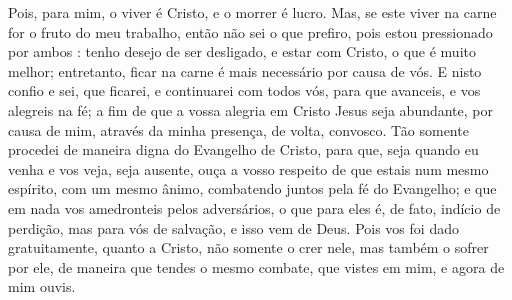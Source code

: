 {Pois, para mim, o viver é Cristo, e o morrer é lucro.
Mas, se este viver na carne for o fruto do meu trabalho, então não sei o que prefiro,
pois estou pressionado por ambos
{} : tenho desejo de ser desligado, e estar com Cristo, o que é muito melhor;
entretanto, ficar na carne é mais necessário por causa de vós.
E nisto confio e sei, que ficarei, e continuarei com todos vós, para que avanceis, e vos alegreis na fé;
a fim de que a vossa alegria em Cristo Jesus seja abundante, por causa de mim, através da minha presença, de volta, convosco.
Tão somente procedei de maneira digna do Evangelho de Cristo, para que, seja quando eu venha e vos veja, seja ausente, ouça a vosso respeito de que estais num mesmo espírito, com um mesmo ânimo, combatendo juntos pela fé do Evangelho;
e que em nada vos amedronteis pelos adversários, o que para eles é, de fato, indício de perdição, mas para vós de salvação, e isso vem de Deus.
Pois vos foi dado gratuitamente, quanto a Cristo, não somente o crer nele, mas também o sofrer por ele,
de maneira que tendes o mesmo combate, que vistes em mim, e agora de mim ouvis.

}
